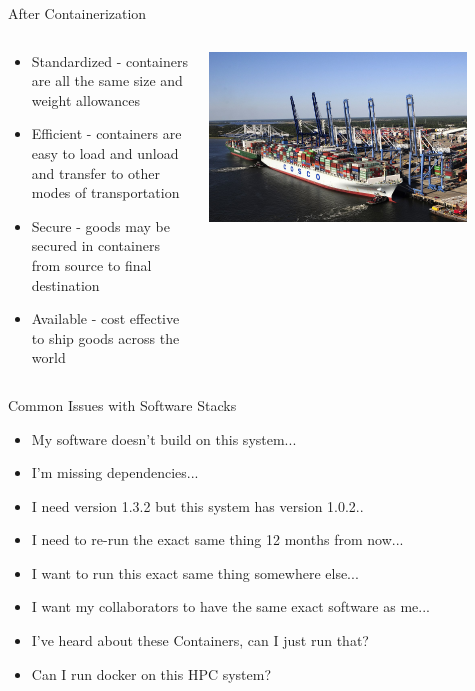 \begin{frame}{After Containerization}
\begin{columns}[c]
\begin{column}{0.5\textwidth}
\begin{itemize}
\item Standardized - containers are all the same size and weight allowances
\item Efficient - containers are easy to load and unload and transfer to other modes of transportation
\item Secure - goods may be secured in containers from source to final destination
\item Available - cost effective to ship goods across the world
\end{itemize}
\end{column}
\begin{column}{0.5\textwidth}
\centering
\includegraphics[width=0.85\textwidth]{images/cargo_ship}
\end{column}
\end{columns}

\end{frame}

\begin{frame}{Common Issues with Software Stacks}
\begin{itemize}
\item My software doesn’t build on this system...
\item I’m missing dependencies...
\item I need version 1.3.2 but this system has version 1.0.2..
\item I need to re-run the exact same thing 12 months from now...
\item I want to run this exact same thing somewhere else...
\item I want my collaborators to have the same exact software as me...
\item I’ve heard about these Containers, can I just run that?
\item Can I run docker on this HPC system?
\end{itemize}
\end{frame}

